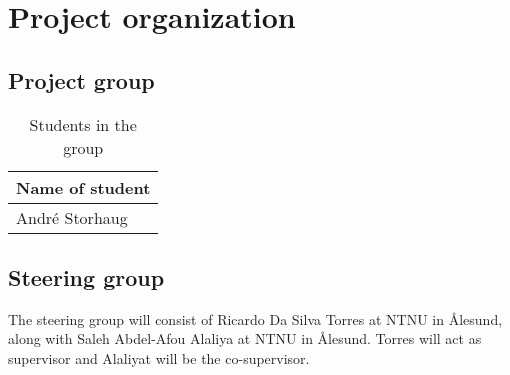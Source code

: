 \chapter{Project organization}

\section{Project group}

\begingroup
\def\arraystretch{1}%

\begin{table}[H]
\caption{Students in the group}
\begin{tabularx}{\textwidth}{ |X| }
	\hline
	\textbf{Name of student} \\
  	\hline 
	André Storhaug \\
  	\hline 
\end{tabularx}
\end{table}
\endgroup

\section{Steering group}
The steering group will consist of Ricardo Da Silva Torres at NTNU in Ålesund, along with Saleh Abdel-Afou Alaliya at NTNU in Ålesund. Torres will act as supervisor and Alaliyat will be the co-supervisor.

